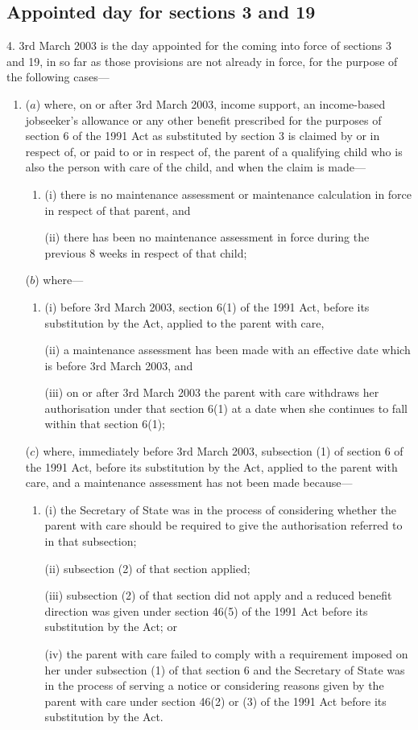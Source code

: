 \documentclass[12pt,a4paper]{article}
\begin{document}
\subsection[4. Appointed day for sections 3 and 19]{Appointed day for sections 3 and 19}

4.  3rd March 2003 is the day appointed for the coming into force of sections 3 and 19, in so far as those provisions are not already in force, for the purpose of the following cases—
\begin{enumerate}\item[]
($a$) where, on or after 3rd March 2003, income support, an income-based jobseeker’s allowance or any other benefit prescribed for the purposes of section 6 of the 1991 Act as substituted by section 3 is claimed by or in respect of, or paid to or in respect of, the parent of a qualifying child who is also the person with care of the child, and when the claim is made—
\begin{enumerate}\item[]
(i) there is no maintenance assessment or maintenance calculation in force in respect of that parent, and

(ii) there has been no maintenance assessment in force during the previous 8 weeks in respect of that child;
\end{enumerate}

($b$) where—
\begin{enumerate}\item[]
(i) before 3rd March 2003, section 6(1) of the 1991 Act, before its substitution by the Act, applied to the parent with care,

(ii) a maintenance assessment has been made with an effective date which is before 3rd March 2003, and

(iii) on or after 3rd March 2003 the parent with care withdraws her authorisation under that section 6(1) at a date when she continues to fall within that section 6(1);
\end{enumerate}

($c$) where, immediately before 3rd March 2003, subsection (1) of section 6 of the 1991 Act, before its substitution by the Act, applied to the parent with care, and a maintenance assessment has not been made because—
\begin{enumerate}\item[]
(i) the Secretary of State was in the process of considering whether the parent with care should be required to give the authorisation referred to in that subsection;

(ii) subsection (2) of that section applied;

(iii) subsection (2) of that section did not apply and a reduced benefit direction was given under section 46(5) of the 1991 Act before its substitution by the Act; or

(iv) the parent with care failed to comply with a requirement imposed on her under subsection (1) of that section 6 and the Secretary of State was in the process of serving a notice or considering reasons given by the parent with care under section 46(2) or (3) of the 1991 Act before its substitution by the Act.
\end{enumerate}
\end{enumerate}
\end{document}
